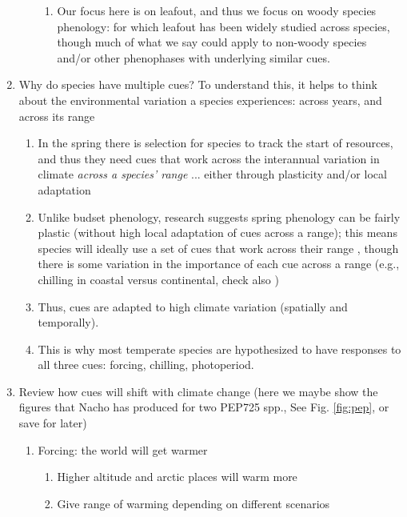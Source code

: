 \documentclass[11pt,letterpaper]{article}
\begin{document}
\begin{enumerate}
\begin{enumerate}
\begin{enumerate}
\item Our focus here is on leafout, and thus we focus on woody species phenology: for which leafout has been widely studied across species, though much of what we say could apply to non-woody species and/or other phenophases with underlying similar cues. 
\end{enumerate}
\end{enumerate}
\item Why do species have multiple cues? To understand this, it helps to think about the environmental variation a species experiences: across years, and across its range
\begin{enumerate}
\item In the spring there is selection for species to track the start of resources, and thus they need cues that work across the interannual variation in climate \emph{across a species' range} ... either through plasticity and/or local adaptation
\item Unlike budset phenology, research suggests spring phenology can be fairly plastic (without high local adaptation of cues across a range); this means species will ideally use a set of cues that work across their range \citep{liepe2016}, though there is some variation in the importance of each cue across a range (e.g., chilling in coastal versus continental, check also \citet{legave2013})
\item Thus, cues are adapted to high climate variation (spatially and temporally).
\item This is why most temperate species are hypothesized to have responses to all three cues: forcing, chilling, photoperiod. 
\end{enumerate}
\item Review how cues will shift with climate change (here we maybe show the figures that Nacho has produced for two PEP725 spp., See Fig. \ref{fig:pep}, or save for later) %
\begin{enumerate}
\item Forcing: the world will get warmer 
\begin{enumerate}
\item Higher altitude and arctic places will warm more
\item Give range of warming depending on different scenarios

\end{enumerate}
\end{enumerate}
\end{enumerate}
\end{document}
